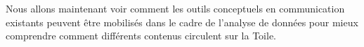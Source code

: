 Nous allons maintenant voir comment les outils conceptuels en communication existants peuvent être mobilisés dans le cadre de l'analyse de données pour mieux comprendre comment différents contenus circulent sur la Toile.



